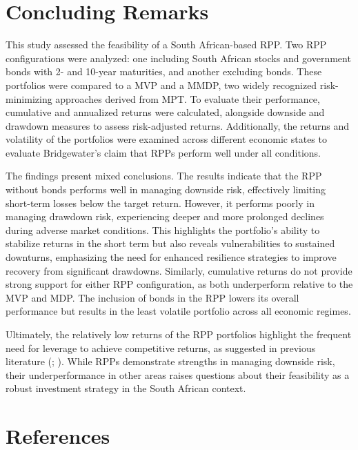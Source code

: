 \documentclass[11pt,preprint]{elsarticle}
\numberwithin{equation}{section}
\numberwithin{figure}{section}
\numberwithin{table}{section}
\begin{document}
\section{Concluding Remarks}\label{concluding-remarks}

This study assessed the feasibility of a South African-based RPP. Two
RPP configurations were analyzed: one including South African stocks and
government bonds with 2- and 10-year maturities, and another excluding
bonds. These portfolios were compared to a MVP and a MMDP, two widely
recognized risk-minimizing approaches derived from MPT. To evaluate
their performance, cumulative and annualized returns were calculated,
alongside downside and drawdown measures to assess risk-adjusted
returns. Additionally, the returns and volatility of the portfolios were
examined across different economic states to evaluate Bridgewater's
claim that RPPs perform well under all conditions.

The findings present mixed conclusions. The results indicate that the
RPP without bonds performs well in managing downside risk, effectively
limiting short-term losses below the target return. However, it performs
poorly in managing drawdown risk, experiencing deeper and more prolonged
declines during adverse market conditions. This highlights the
portfolio's ability to stabilize returns in the short term but also
reveals vulnerabilities to sustained downturns, emphasizing the need for
enhanced resilience strategies to improve recovery from significant
drawdowns. Similarly, cumulative returns do not provide strong support
for either RPP configuration, as both underperform relative to the MVP
and MDP. The inclusion of bonds in the RPP lowers its overall
performance but results in the least volatile portfolio across all
economic regimes.

Ultimately, the relatively low returns of the RPP portfolios highlight
the frequent need for leverage to achieve competitive returns, as
suggested in previous literature (; ). While RPPs demonstrate strengths in managing
downside risk, their underperformance in other areas raises questions
about their feasibility as a robust investment strategy in the South
African context.

\section*{References}\label{references}
\end{document}

